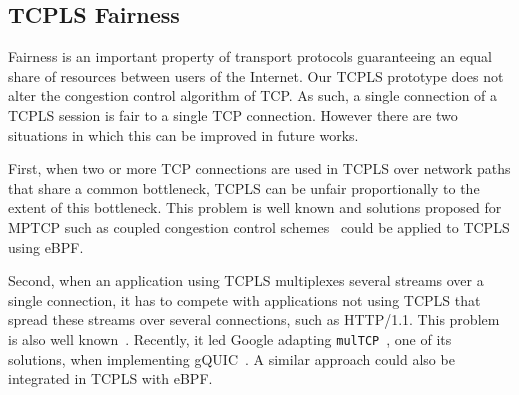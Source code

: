 \subsection{TCPLS Fairness}

Fairness is an important property of transport protocols
guaranteeing an equal share of resources between users of the Internet. Our 
TCPLS prototype does not alter the congestion control algorithm of TCP. As 
such, a single connection of a TCPLS session is fair to a single TCP connection.
However there are two situations in which this can be improved in future works.

First, when two or more TCP connections are used in TCPLS over network paths 
that share a common bottleneck, TCPLS can be unfair proportionally to the 
extent of this bottleneck.
This problem is well known and solutions proposed for MPTCP such as coupled 
congestion control 
schemes~\cite{wischik2011design,peng2014multipath,khalili2013mptcp} could be 
applied to TCPLS using eBPF.

Second, when an application using TCPLS multiplexes several streams over a 
single connection, it has to compete with applications not using TCPLS that 
spread these streams over several connections, such as HTTP/1.1. This problem 
is also well known~\cite{min2019experimental}. Recently, it led Google adapting 
\texttt{mulTCP}~\cite{crowcroft1998differentiated}, one of its solutions, when 
implementing gQUIC~\cite{langley2017quic}. A similar approach could also be 
integrated in TCPLS with eBPF.




